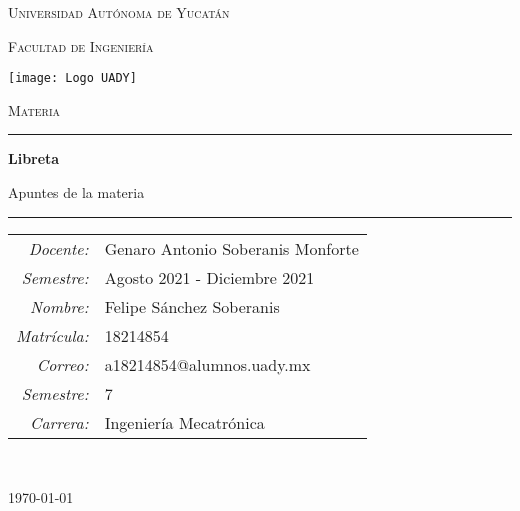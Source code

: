 \documentclass[Libreta.tex]{subfiles}
\begin{document}
\thispagestyle{empty}
\setcounter{page}{0}

{
    \centering
    \setlength{\parindent}{0pt}

    {\LARGE\textsc{Universidad Autónoma de Yucatán}\\}

    {\large\textsc{Facultad de Ingeniería}\\}

    \vspace{2em}

    \texttt{[image: Logo UADY]}

    \vspace{1em}

    {\Large\textsc{Materia}\\}

    \vspace{1em}

    \rule{\textwidth}{1pt}

    {\LARGE\textbf{Libreta}\\}

    {\large Apuntes de la materia\\}

    \rule{\textwidth}{1pt}

    \vspace{3em}

    {
        \raggedright
        \begin{tabular}{r l}
            \textit{Docente:} & Genaro Antonio Soberanis Monforte  \\

            \textit{Semestre:} & Agosto 2021 - Diciembre 2021 \\

            \textit{Nombre:} & Felipe Sánchez Soberanis \\

            \textit{Matrícula:} & 18214854 \\

            \textit{Correo:} & a18214854@alumnos.uady.mx \\

            \textit{Semestre:} & 7 \\

            \textit{Carrera:} & Ingeniería Mecatrónica
        \end{tabular}
    \\}

    \vfill

    {
        \raggedleft
        \today
    \\}
}
\end{document}
